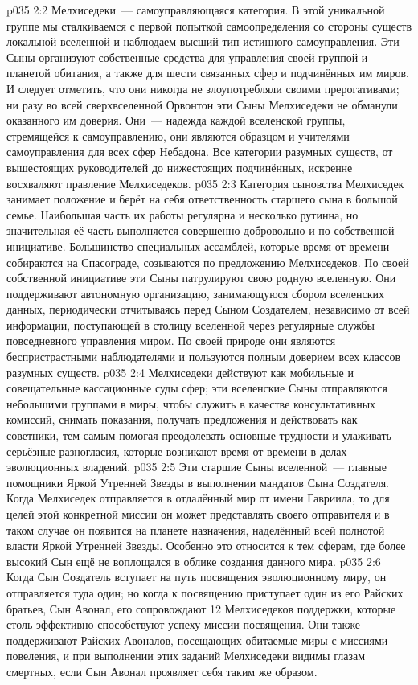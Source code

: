 \vs p035 2:2 Мелхиседеки~--- самоуправляющаяся категория. В этой уникальной группе мы сталкиваемся с первой попыткой самоопределения со стороны существ локальной вселенной и наблюдаем высший тип истинного самоуправления. Эти Сыны организуют собственные средства для управления своей группой и планетой обитания, а также для шести связанных сфер и подчинённых им миров. И следует отметить, что они никогда не злоупотребляли своими прерогативами; ни разу во всей сверхвселенной Орвонтон эти Сыны Мелхиседеки не обманули оказанного им доверия. Они~--- надежда каждой вселенской группы, стремящейся к самоуправлению, они являются образцом и учителями самоуправления для всех сфер Небадона. Все категории разумных существ, от вышестоящих руководителей до нижестоящих подчинённых, искренне восхваляют правление Мелхиседеков.
\vs p035 2:3 \pc Категория сыновства Мелхиседек занимает положение и берёт на себя ответственность старшего сына в большой семье. Наибольшая часть их работы регулярна и несколько рутинна, но значительная её часть выполняется совершенно добровольно и по собственной инициативе. Большинство специальных ассамблей, которые время от времени собираются на Спасограде, созываются по предложению Мелхиседеков. По своей собственной инициативе эти Сыны патрулируют свою родную вселенную. Они поддерживают автономную организацию, занимающуюся сбором вселенских данных, периодически отчитываясь перед Сыном Создателем, независимо от всей информации, поступающей в столицу вселенной через регулярные службы повседневного управления миром. По своей природе они являются беспристрастными наблюдателями и пользуются полным доверием всех классов разумных существ.
\vs p035 2:4 Мелхиседеки действуют как мобильные и совещательные кассационные суды сфер; эти вселенские Сыны отправляются небольшими группами в миры, чтобы служить в качестве консультативных комиссий, снимать показания, получать предложения и действовать как советники, тем самым помогая преодолевать основные трудности и улаживать серьёзные разногласия, которые возникают время от времени в делах эволюционных владений.
\vs p035 2:5 Эти старшие Сыны вселенной~--- главные помощники Яркой Утренней Звезды в выполнении мандатов Сына Создателя. Когда Мелхиседек отправляется в отдалённый мир от имени Гавриила, то для целей этой конкретной миссии он может представлять своего отправителя и в таком случае он появится на планете назначения, наделённый всей полнотой власти Яркой Утренней Звезды. Особенно это относится к тем сферам, где более высокий Сын ещё не воплощался в облике создания данного мира.
\vs p035 2:6 Когда Сын Создатель вступает на путь посвящения эволюционному миру, он отправляется туда один; но когда к посвящению приступает один из его Райских братьев, Сын Авонал, его сопровождают 12 Мелхиседеков поддержки, которые столь эффективно способствуют успеху миссии посвящения. Они также поддерживают Райских Авоналов, посещающих обитаемые миры с миссиями повеления, и при выполнении этих заданий Мелхиседеки видимы глазам смертных, если Сын Авонал проявляет себя таким же образом.
